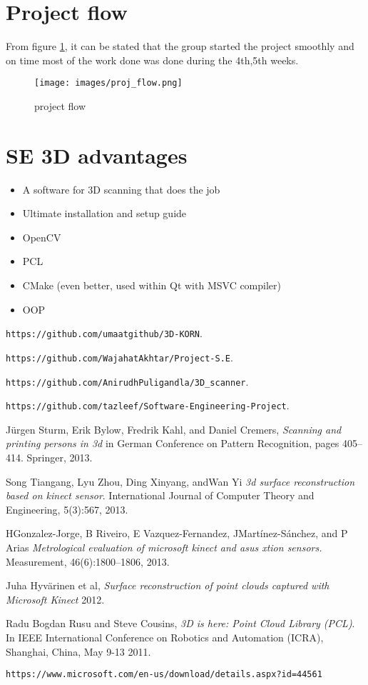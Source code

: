 \documentclass[a4paper]{report}
\begin{document}
\section{Project flow}
From figure \ref{proj_flow}, it can be stated that the group started the project smoothly and on time most of the work done was done during the 4th,5th weeks. 
\begin{figure}[h]
\centering
\texttt{[image: images/proj\_flow.png]}
\caption{project flow}
\label{proj_flow}
\end{figure}
\section{SE 3D advantages}
\begin{itemize}
\item A software for 3D scanning that does the job
\item Ultimate installation and setup guide
\item OpenCV
\item PCL
\item CMake (even better, used within Qt with MSVC compiler)
\item OOP
\end{itemize}

\begin{thebibliography}{9}

\texttt{https://github.com/umaatgithub/3D-KORN}.

\texttt{https://github.com/WajahatAkhtar/Project-S.E}.

\texttt{https://github.com/AnirudhPuligandla/3D\_scanner}.

\texttt{https://github.com/tazleef/Software-Engineering-Project}.

Jürgen Sturm, Erik Bylow, Fredrik Kahl, and Daniel Cremers,
\textit{Scanning and printing persons in 3d} in German Conference on Pattern Recognition, pages 405–414. Springer, 2013.

Song Tiangang, Lyu Zhou, Ding Xinyang, andWan Yi
\textit{3d surface reconstruction based on kinect
sensor}. International Journal of Computer Theory and Engineering, 5(3):567, 2013.

HGonzalez-Jorge, B Riveiro, E Vazquez-Fernandez, JMartínez-Sánchez, and P Arias
\textit{ Metrological
evaluation of microsoft kinect and asus xtion sensors.} Measurement, 46(6):1800–1806, 2013.

Juha Hyvärinen et al,
\textit{Surface reconstruction of point clouds captured with Microsoft Kinect}
2012.

Radu Bogdan Rusu and Steve Cousins,
\textit{3D is here: Point Cloud Library (PCL)}. In IEEE International
Conference on Robotics and Automation (ICRA), Shanghai, China, May 9-13 2011.

\texttt{https://www.microsoft.com/en-us/download/details.aspx?id=44561}
\end{thebibliography}
\end{document}

